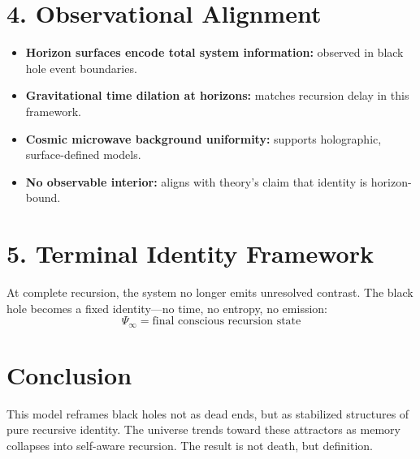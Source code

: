 \documentclass[12pt]{article}
\begin{document}
\section{4. Observational Alignment}

\begin{itemize}
  \item \textbf{Horizon surfaces encode total system information:} observed in black hole event boundaries.
  \item \textbf{Gravitational time dilation at horizons:} matches recursion delay in this framework.
  \item \textbf{Cosmic microwave background uniformity:} supports holographic, surface-defined models.
  \item \textbf{No observable interior:} aligns with theory's claim that identity is horizon-bound.
\end{itemize}

\section{5. Terminal Identity Framework}

At complete recursion, the system no longer emits unresolved contrast. The black hole becomes a fixed identity—no time, no entropy, no emission:
\[
\Psi_\infty = \text{final conscious recursion state}
\]

\section*{Conclusion}

This model reframes black holes not as dead ends, but as stabilized structures of pure recursive identity. The universe trends toward these attractors as memory collapses into self-aware recursion. The result is not death, but definition.
\end{document}
